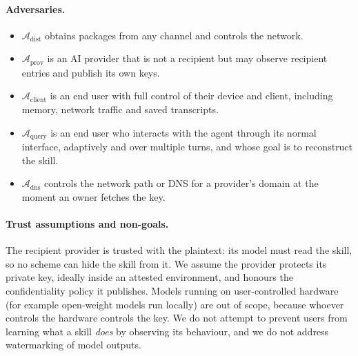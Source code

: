 \paragraph{Adversaries.}
\begin{itemize}
  \item $\mathcal{A}_{\text{dist}}$ obtains packages from any channel and controls the network.
  \item $\mathcal{A}_{\text{prov}}$ is an AI provider that is not a recipient but may observe
  recipient entries and publish its own keys.
  \item $\mathcal{A}_{\text{client}}$ is an end user with full control of their device and client,
  including memory, network traffic and saved transcripts.
  \item $\mathcal{A}_{\text{query}}$ is an end user who interacts with the agent through its normal
  interface, adaptively and over multiple turns, and whose goal is to reconstruct the skill.
  \item $\mathcal{A}_{\text{dns}}$ controls the network path or DNS for a provider's domain at the
  moment an owner fetches the key.
\end{itemize}

\paragraph{Trust assumptions and non-goals.}
The recipient provider is trusted with the plaintext: its model must read the skill, so no scheme
can hide the skill from it. We assume the provider protects its private key, ideally inside an
attested environment, and honours the confidentiality policy it publishes. Models running on
user-controlled hardware (for example open-weight models run locally) are out of scope, because
whoever controls the hardware controls the key. We do not attempt to prevent users from learning
what a skill \emph{does} by observing its behaviour, and we do not address watermarking of model
outputs.
